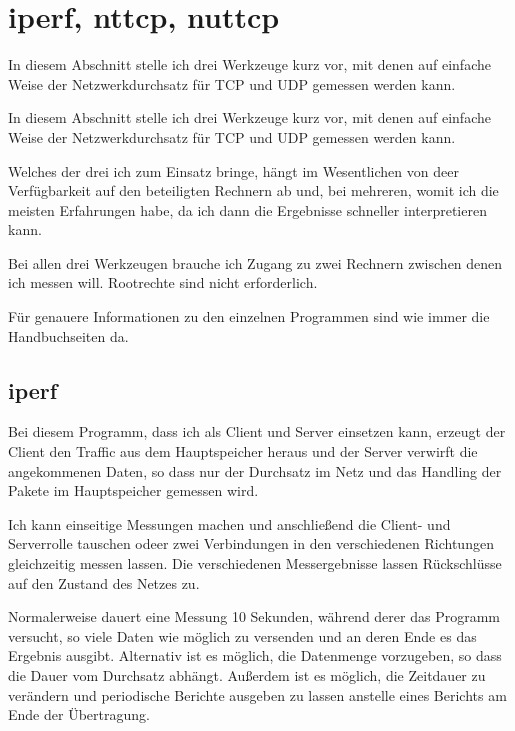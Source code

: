\section{iperf, nttcp, nuttcp}
\label{sec:netz-werkzeuge-iperf}
\begin{abstractsec}
  In diesem Abschnitt stelle ich drei Werkzeuge kurz vor, mit denen auf
  einfache Weise der Netzwerkdurchsatz für TCP und UDP gemessen werden kann.
\end{abstractsec}
\begin{normaltext}
  In diesem Abschnitt stelle ich drei Werkzeuge kurz vor, mit denen auf
  einfache Weise der Netzwerkdurchsatz für TCP und UDP gemessen werden kann.

  Welches der drei ich zum Einsatz bringe, hängt im Wesentlichen von deer
  Verfügbarkeit auf den beteiligten Rechnern ab und, bei mehreren, womit ich
  die meisten Erfahrungen habe, da ich dann die Ergebnisse schneller
  interpretieren kann.

  Bei allen drei Werkzeugen brauche ich Zugang zu zwei Rechnern zwischen denen
  ich messen will. Rootrechte sind nicht erforderlich.

  Für genauere Informationen zu den einzelnen Programmen sind wie immer die
  Handbuchseiten da.

  \subsection*{iperf}
  Bei diesem Programm, dass ich als Client und Server einsetzen kann, erzeugt
  der Client den Traffic aus dem Hauptspeicher heraus und der Server verwirft
  die angekommenen Daten, so dass nur der Durchsatz im Netz und das Handling
  der Pakete im Hauptspeicher gemessen wird.

  Ich kann einseitige Messungen machen und anschließend die Client- und
  Serverrolle tauschen odeer zwei Verbindungen in den verschiedenen Richtungen
  gleichzeitig messen lassen. Die verschiedenen Messergebnisse lassen
  Rückschlüsse auf den Zustand des Netzes zu.

  Normalerweise dauert eine Messung 10 Sekunden, während derer das Programm
  versucht, so viele Daten wie möglich zu versenden und an deren Ende es das
  Ergebnis ausgibt. Alternativ ist es möglich, die Datenmenge vorzugeben, so
  dass die Dauer vom Durchsatz abhängt. Außerdem ist es möglich, die Zeitdauer
  zu verändern und periodische Berichte ausgeben zu lassen anstelle eines
  Berichts am Ende der Übertragung.


\end{normaltext}
